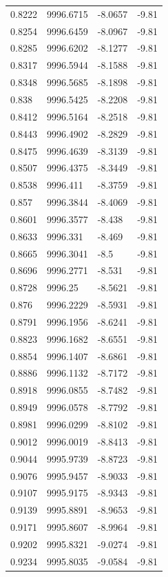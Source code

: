 \begin{table}[H]
\begin{tabular}{llll}
0.8222 & 9996.6715 & -8.0657 & -9.81 \\
0.8254 & 9996.6459 & -8.0967 & -9.81 \\
0.8285 & 9996.6202 & -8.1277 & -9.81 \\
0.8317 & 9996.5944 & -8.1588 & -9.81 \\
0.8348 & 9996.5685 & -8.1898 & -9.81 \\
0.838 & 9996.5425 & -8.2208 & -9.81 \\
0.8412 & 9996.5164 & -8.2518 & -9.81 \\
0.8443 & 9996.4902 & -8.2829 & -9.81 \\
0.8475 & 9996.4639 & -8.3139 & -9.81 \\
0.8507 & 9996.4375 & -8.3449 & -9.81 \\
0.8538 & 9996.411 & -8.3759 & -9.81 \\
0.857 & 9996.3844 & -8.4069 & -9.81 \\
0.8601 & 9996.3577 & -8.438 & -9.81 \\
0.8633 & 9996.331 & -8.469 & -9.81 \\
0.8665 & 9996.3041 & -8.5 & -9.81 \\
0.8696 & 9996.2771 & -8.531 & -9.81 \\
0.8728 & 9996.25 & -8.5621 & -9.81 \\
0.876 & 9996.2229 & -8.5931 & -9.81 \\
0.8791 & 9996.1956 & -8.6241 & -9.81 \\
0.8823 & 9996.1682 & -8.6551 & -9.81 \\
0.8854 & 9996.1407 & -8.6861 & -9.81 \\
0.8886 & 9996.1132 & -8.7172 & -9.81 \\
0.8918 & 9996.0855 & -8.7482 & -9.81 \\
0.8949 & 9996.0578 & -8.7792 & -9.81 \\
0.8981 & 9996.0299 & -8.8102 & -9.81 \\
0.9012 & 9996.0019 & -8.8413 & -9.81 \\
0.9044 & 9995.9739 & -8.8723 & -9.81 \\
0.9076 & 9995.9457 & -8.9033 & -9.81 \\
0.9107 & 9995.9175 & -8.9343 & -9.81 \\
0.9139 & 9995.8891 & -8.9653 & -9.81 \\
0.9171 & 9995.8607 & -8.9964 & -9.81 \\
0.9202 & 9995.8321 & -9.0274 & -9.81 \\
0.9234 & 9995.8035 & -9.0584 & -9.81 \\

\end{tabular}
\end{table}

